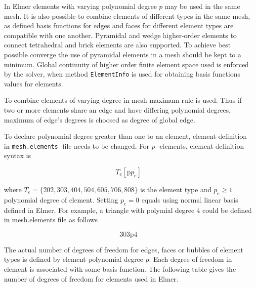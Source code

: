 In Elmer elements with varying polynomial degree $p$ may be used in the same mesh. It is also possible to combine elements of different types in the same mesh, as defined basis functions for edges and faces for different element types are compatible with one another. Pyramidal and wedge higher-order elements to connect tetrahedral and brick elements are also supported. To achieve best possible converge the use of pyramidal elements in a mesh should be kept to a minimum. Global continuity of higher order finite element space used is enforced by the solver, when method \texttt{ElementInfo} is used for obtaining basis functions values for elements.  

To combine elements of varying degree in mesh maximum rule is used. Thus if two or more elements share an edge and have differing polynomial degrees, maximum of edge's degrees is choosed as degree of global edge. 

To declare polynomial degree greater than one to an element, element definition in \texttt{mesh.elements} -file needs to be changed. For $p$ -elements, element definition syntax is 

\[
T_e[\mbox{p}p_e]
\]

\noindent where $T_e=\{202,303,404,504,605,706,808\}$ is the element type and $p_e\geq 1$ polynomial degree of element. Setting $p_e=0$ equals using normal linear basis defined in Elmer. For example, a triangle with polymial degree $4$ could be defined in mesh.elements file as follows

\[
303\mbox{p}4
\]

The actual number of degrees of freedom for edges, faces or bubbles of element types is defined by element polynomial degree $p$. Each degree of freedom in element is associated with some basis function. The following table gives the number of degrees of freedom for elements used in Elmer.  

